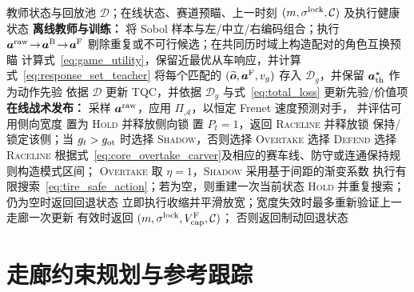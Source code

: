 \documentclass[final,5p,twocolumn]{elsarticle}
\begin{document}
\begin{algorithm}[!tbp]
\caption{博弈监督的战术走廊策略}
\label{alg:tactical_corridor}
\footnotesize
\begin{algorithmic}[1]
\REQUIRE 教师状态与回放池 $\mathcal D$；在线状态、赛道预瞄、上一时刻
$(m,\sigma^{\rm lock},\mathcal C)$ 及执行健康状态
\STATE \textbf{离线教师与训练：}
\STATE 将 Sobol 样本与左/中立/右编码组合；执行
$\bm a^{\rm raw}\!\rightarrow\!\bm a^{\rm B}\!\rightarrow\!\bm a^{\rm F}$
\STATE 剔除重复或不可行候选；在共同历时域上构造配对的角色互换预瞄
\STATE 计算式~\eqref{eq:game_utility}，保留近最优从车响应，并计算
式~\eqref{eq:response_set_teacher}
\STATE 将每个匹配的 $(\widetilde{\bm o},\bm a^{\rm F},v_g)$ 存入
$\mathcal D_g$，并保留 $\bm a_{\rm th}^{\star}$ 作为动作先验
\ENDFOR
\STATE 依据 $\mathcal D$ 更新 TQC，并依据 $\mathcal D_g$ 与式~\eqref{eq:total_loss}
更新先验/价值项
\STATE \textbf{在线战术发布：}
\STATE 采样 $\bm a^{\rm raw}$，应用 $\Pi_{\mathcal A}$，以恒定 Frenet 速度预测对手，
并评估可用侧向宽度
\STATE 置为 \textsc{Hold} 并释放侧向锁
\STATE 置 $P_t=1$，返回 \textsc{Raceline} 并释放锁
\STATE 保持/锁定该侧；当 $g_t>g_{\rm ot}$ 时选择 \textsc{Shadow}，否则选择
\textsc{Overtake}
\STATE 选择 \textsc{Defend}
\ELSE
\STATE 选择 \textsc{Raceline}
\ENDIF
\STATE 根据式~\eqref{eq:core_overtake_carver}及相应的赛车线、防守或连通保持规则构造模式区间；
\textsc{Overtake} 取 $\eta=1$，\textsc{Shadow} 采用基于间距的渐变系数
\STATE 执行有限搜索~\eqref{eq:tire_safe_action}；若为空，则重建一次当前状态
\textsc{Hold} 并重复搜索；仍为空时返回回退状态
\STATE 立即执行收缩并平滑放宽；宽度失效时最多重新验证上一走廊一次更新
\RETURN 有效时返回 $(m,\sigma^{\rm lock},V_{\rm cap}^{\rm F},\mathcal C)$；
否则返回制动回退状态
\end{algorithmic}
\end{algorithm}

\section{走廊约束规划与参考跟踪}
\label{sec:execution}\label{sec:planner}\label{sec:controller}
\end{document}

